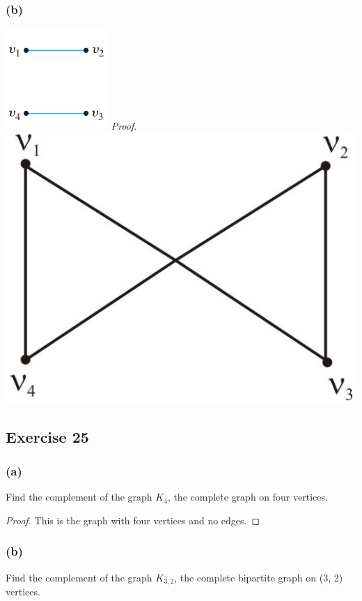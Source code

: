 \documentclass[14pt]{extarticle}
\begin{document}
\subsubsection{(b)}
\includegraphics[scale=0.5]{../images/10.1.24.b.1.png}
{\it Proof.}
\includegraphics[scale=0.1]{../images/10.1.24.b.2.png}

\subsection{Exercise 25}
\subsubsection{(a)}
Find the complement of the graph \(K_4\), the complete graph on four vertices.

\begin{proof}
    This is the graph with four vertices and no edges.
\end{proof}

\subsubsection{(b)}
Find the complement of the graph \(K_{3,2}\), the complete bipartite graph on (3, 2) vertices.
\end{document}

